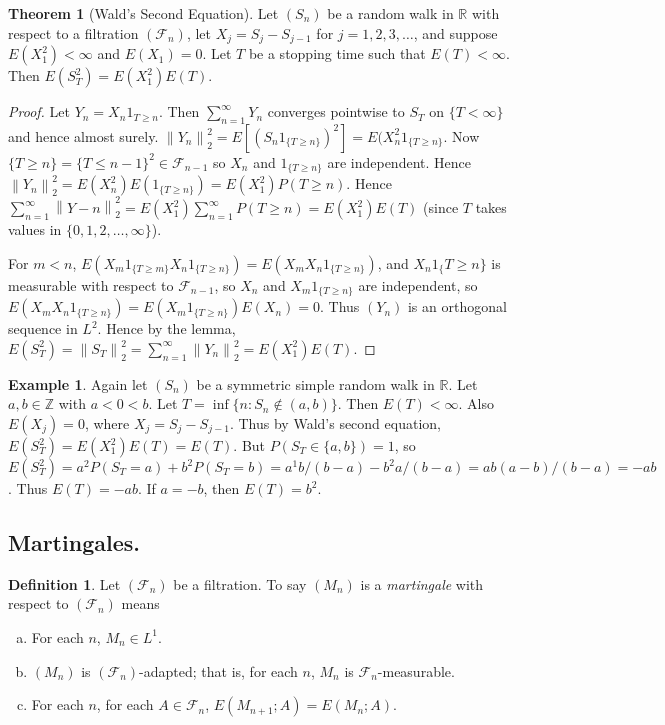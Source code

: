 \documentclass{article}
\newcommand{\R}{\mathbb{R}}
\newcommand{\Z}{\mathbb{Z}}
\newcommand{\F}{\mathscr{F}}
\newcommand{\norm}[1]{\left\lVert#1\right\rVert} %
\theoremstyle{definition}
\newtheorem{theorem}{Theorem}
\newtheorem*{example}{Example}
\newtheorem*{definition}{Definition}
\begin{document}
\begin{theorem}[Wald's Second Equation]
    Let $(S_n)$ be a random walk in $\R$ with respect to a filtration $(\F_n)$, let $X_j = S_j - S_{j-1}$ for $j = 1, 2, 3, \dots$, and suppose $E(X_1^2) < \infty$ and $E(X_1) = 0$. Let $T$ be a stopping time such that $E(T) < \infty$. Then $E(S_T^2) = E(X_1^2)E(T)$.
\end{theorem}
\begin{proof}
    Let $Y_n = X_n 1_{T \geq n}$. Then $\sum_{n=1}^\infty Y_n$ converges pointwise to $S_T$ on $\{T < \infty\}$ and hence almost surely. $\norm{Y_n}_2^2 = E[(S_n 1_{\{T \geq n\}})^2] = E(X_n^2 1_{\{T \geq n\}}$. Now $\{T \geq n\} = \{T \leq n-1\}^2 \in \F_{n-1}$ so $X_n$ and $1_{\{T \geq n\}}$ are independent. Hence $\norm{Y_n}_2^2 = E(X_n^2)E(1_{\{T \geq n\}}) = E(X_1^2)P(T \geq n)$. Hence $\sum_{n=1}^\infty \norm{Y-n}_2^2 = E(X_1^2)\sum_{n=1}^\infty P(T \geq n) = E(X_1^2)E(T)$ (since $T$ takes values in $\{0, 1, 2, \dots, \infty\}$).
    
    For $m < n$, $E(X_m 1_{\{T \geq m\}} X_n 1_{\{T \geq n\}}) = E(X_m X_n 1_{\{T \geq n\}})$, and $X_n 1_\{T \geq n\}$ is measurable with respect to $\F_{n-1}$, so $X_n$ and $X_m 1_{\{T \geq n\}}$ are independent, so $E(X_m X_n 1_{\{T \geq n\}}) = E(X_m 1_{\{T \geq n\}})E(X_n) = 0$. Thus $(Y_n)$ is an orthogonal sequence in $L^2$. Hence by the lemma, $E(S_T^2) = \norm{S_T}_2^2 = \sum_{n=1}^\infty \norm{Y_n}_2^2 = E(X_1^2)E(T)$.
\end{proof}

\begin{example}
Again let $(S_n)$ be a symmetric simple random walk in $\R$. Let $a, b \in \Z$ with $a < 0 < b$. Let $T = \inf\{n : S_n \notin (a,b)\}$. Then $E(T) < \infty$. Also $E(X_j) = 0$, where $X_j = S_j - S_{j-1}$. Thus by Wald's second equation, $E(S_T^2) = E(X_1^2)E(T) = E(T)$. But $P(S_T \in \{a, b\}) = 1$, so $E(S_T^2) = a^2P(S_T = a) + b^2 P(S_T = b) = a^1b/(b-a) - b^2a/(b-a) = ab(a-b)/(b-a) = -ab$. Thus $E(T) = -ab$. If $a = -b$, then $E(T) = b^2$.
\end{example}

\subsection*{Martingales.}
\begin{definition}
Let $(\F_n)$ be a filtration. To say $(M_n)$ is a \emph{martingale} with respect to $(\F_n)$ means
\begin{enumerate}[(a)]
    \item For each $n$, $M_n \in L^1$.
    \item $(M_n)$ is $(\F_n)$-adapted; that is, for each $n$, $M_n$ is $\F_n$-measurable.
    \item For each $n$, for each $A \in \F_n$, $E(M_{n+1} ; A) = E(M_n ; A)$.
\end{enumerate}
\end{definition}
\end{document}
